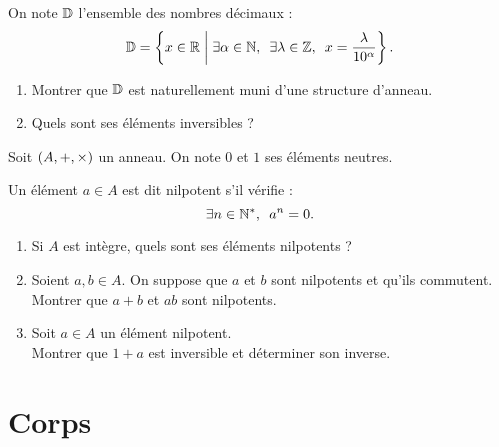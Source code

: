 \begin{corr}
\end{corr}

\begin{exo}[Exercice 18]
On note \(\mathbb{D}\) l'ensemble des nombres décimaux : \[\D=\accol{x\in\R\tq\quantifs{\exists\alpha\in\N;\exists\lambda\in\Z}x=\dfrac{\lambda}{10^\alpha}}.\]

\begin{enumerate}
\item Montrer que \(\mathbb{D}\) est naturellement muni d'une structure d'anneau. \\

\item Quels sont ses éléments inversibles ?
\end{enumerate}
\end{exo}

\begin{corr}
\end{corr}

\begin{exo}[Exercice 19]
Soit \(\anneau{A}\) un anneau. On note \(0\) et \(1\) ses éléments neutres.

Un élément \(a\in A\) est dit nilpotent s'il vérifie : \[\quantifs{\exists n\in\Ns}a^n=0.\]

\begin{enumerate}
\item Si \(A\) est intègre, quels sont ses éléments nilpotents ? \\

\item Soient \(a,b\in A\). On suppose que \(a\) et \(b\) sont nilpotents et qu'ils commutent. \\

Montrer que \(a+b\) et \(ab\) sont nilpotents. \\

\item Soit \(a\in A\) un élément nilpotent. \\

Montrer que \(1+a\) est inversible et déterminer son inverse.
\end{enumerate}
\end{exo}

\begin{corr}
\end{corr}

\section{Corps}

